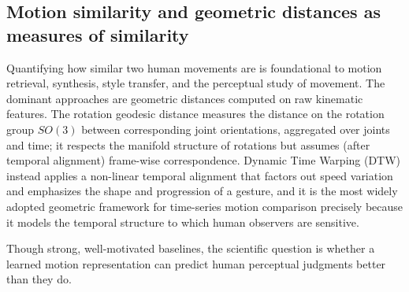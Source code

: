 \documentclass[letterpaper]{article} %
\begin{document}
\subsection{Motion similarity and geometric distances as measures of similarity}
Quantifying how {similar} two human movements are is foundational to motion retrieval,
synthesis, style transfer, and the perceptual study of movement. The dominant approaches are
geometric distances computed on raw kinematic features. The rotation geodesic distance measures the
distance on the rotation group $SO(3)$ between corresponding joint orientations, aggregated over
joints and time; it respects the manifold structure of rotations but assumes (after temporal
alignment) frame-wise correspondence. Dynamic Time Warping (DTW) instead applies a non-linear
temporal alignment that factors out speed variation and emphasizes the {shape} and
{progression} of a gesture, and it is the most widely adopted geometric framework for time-series
motion comparison precisely because it models the temporal structure to which human observers are
sensitive.

Though strong, well-motivated baselines, the scientific question is whether a {learned}
motion representation can predict human perceptual judgments better than they do.
\end{document}
